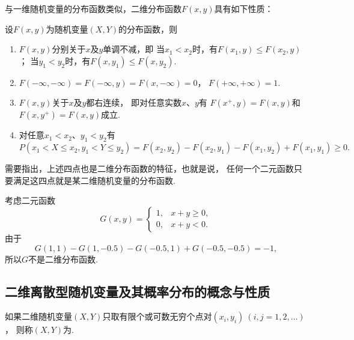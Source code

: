 与一维随机变量的分布函数类似，二维分布函数\(F(x,y)\)具有如下性质：
\begin{property}
设\(F(x,y)\)为随机变量\((X,Y)\)的分布函数，则
\begin{enumerate}
	\item \(F(x,y)\)分别关于\(x\)及\(y\)单调不减，即
	当\(x_1 < x_2\)时，有\(F(x_1,y) \leq F(x_2,y)\)；
	当\(y_1 < y_2\)时，有\(F(x,y_1) \leq F(x,y_2)\).

	\item \(F(-\infty,-\infty)=F(-\infty,y)=F(x,-\infty)=0\)，
	\(F(+\infty,+\infty)=1\).

	\item \(F(x,y)\)关于\(x\)及\(y\)都右连续，
	即对任意实数\(x\)、\(y\)有
	\(F(x^+,y)=F(x,y)\)和\(F(x,y^+)=F(x,y)\)成立.

	\item 对任意\(x_1 < x_2\)、\(y_1 < y_2\)有\begin{equation*}
		P(x_1 < X \leq x_2, y_1 < Y \leq y_2)
		= F(x_2,y_2) - F(x_2,y_1) - F(x_1,y_2) + F(x_1,y_1)
		\geq 0.
	\end{equation*}
\end{enumerate}
\end{property}

需要指出，上述四点也是二维分布函数的特征，也就是说，
任何一个二元函数只要满足这四点就是某二维随机变量的分布函数.

\begin{example}
考虑二元函数\begin{equation*}
	G(x,y) = \left\{ \begin{array}{cl}
		1, & x+y\geq0, \\
		0, & x+y<0.
	\end{array} \right.
\end{equation*}
由于\begin{equation*}
	G(1,1)-G(1,-0.5)-G(-0.5,1)+G(-0.5,-0.5)=-1,
\end{equation*}
所以\(G\)不是二维分布函数.
\end{example}

\subsection{二维离散型随机变量及其概率分布的概念与性质}
\begin{definition}
如果二维随机变量\((X,Y)\)只取有限个或可数无穷个点对\((x_i,y_i)\ (i,j=1,2,\dotsc)\)，
则称\((X,Y)\)为.
\end{definition}

